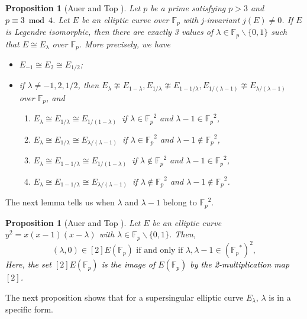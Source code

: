 \documentclass[a4paper, 11pt]{article}
\theoremstyle{plain}
\newtheorem{prop}[defn]{Proposition}
\newcommand{\?}{\textcolor{red}{??}}
\newcommand{\lm}{\lambda}
\newcommand{\fp}{\mathbb{F}_p}
\begin{document}
\begin{prop}[Auer and Top {\cite[Lemma 3.1.]{AT02}}]
\label{legendrecase}
    Let $p$ be a prime satisfying $p>3$ and \textcolor{black}{$p \equiv 3 \bmod 4$}. Let $E$ be an elliptic curve over $\fp$ with j-invariant $j(E) \ne 0$. If $E$ is Legendre isomorphic, then there are exactly 3 values of $\lm \in \fp \smallsetminus \{0,1\}$ such that $E \cong E_{\lm}$ over $\fp$. More precisely, we have
    \begin{itemize}
        \item  $E_{-1} \cong E_{2} \cong E_{1/2}$;
        \item  if $\lm \neq -1,2,1/2$, then $E_{\lm} \ncong E_{1-\lm},E_{1/\lm} \ncong E_{1-1/\lm},E_{1/(\lm-1)} \ncong E_{\lm/(\lm-1)}$ over $\fp$, and 
        \begin{enumerate}
        
            \item [] $E_{\lm} \cong E_{1/\lm} \cong E_{1/(1-\lm)} \ $ if $\lm \in {\fp}^2$ and $ \lm-1 \in {\fp}^2$,

            \item[]  $E_{\lm} \cong E_{1/\lm} \cong E_{\lm/(\lm-1)} \ $
            if $\lm \in {\fp}^2$ and $\lm-1 \notin {\fp}^2$,

            \item [] $E_{\lm} \cong E_{1-1/\lm} \cong E_{1/(1-\lm)} \ $ if $\lm \notin {\fp}^2$ and $ \lm-1 \in {\fp}^2$,

            \item[]  $E_{\lm} \cong E_{1-1/\lm} \cong E_{\lm/(\lm-1)} \ $
            if $\lm \notin {\fp}^2$ and $ \lm-1 \notin {\fp}^2$.
            
        \end{enumerate}
    \end{itemize}
\end{prop}

The next lemma tells us when $\lm$ and $\lm-1$ belong to ${\fp}^2$.


\begin{prop}[Auer and Top {\cite[Lemma 2.1.]{AT02}}]
\label{abginf2?}
    Let $E$ be an elliptic curve $y^2=x(x-1)(x-\lm)$ with $\lm \in \fp \smallsetminus\{0,1\}$. Then,
    \[
    (\lm,0)\in [2]E(\fp) \text{ if and only if } \lm,\lm-1 \in \left( {\fp}^{*} \right) ^2,
    \]
   \textcolor{black}{ Here, the set $[2]E(\fp)$ is the image of $E(\fp)$ by the 2-multiplication map $[2]$.}
\end{prop}

The next proposition shows that for a supersingular elliptic curve $E_{\lm}$, $\lm$ is in a specific form.
\end{document}
